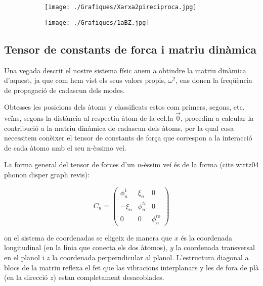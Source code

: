 \documentclass[12pt,twoside,a4paper]{article}%
\begin{document}
\begin{figure}[h]
\centering
\begin{subfigure}[b]{0.4\textwidth}
\texttt{[image: ./Grafiques/Xarxa2pireciproca.jpg]}
\end{subfigure}
\begin{subfigure}[b]{0.4\textwidth}
\texttt{[image: ./Grafiques/1aBZ.jpg]}
\end{subfigure}
\end{figure}





\subsection{Tensor de constants de forca i matriu dinàmica}

Una vegada descrit el nostre sistema físic anem a obtindre la matriu dinàmica d'aquest, ja que com hem vist els seus valors propis, $\omega^2$, ens donen la freqüència de propagació de cadascun dels modes.

Obtesses les posicions dels àtoms y classificats estos com primers, segons, etc. veïns, segons la distància al respectiu àtom de la ce\l.la $\vec 0$, procedim a calcular la contribució a la matriu dinàmica de cadascun dels àtoms, per la qual cosa necessitem conèixer el tensor de constants de for\c{c}a que correspon a la interacció de cada àtomo amb el seu n-èssimo veí.

La forma general del tensor de forces d'un $n$-èssim veí és de la forma (cite wirtz04 phonon disper graph revis): 


\begin{equation}
C_n=\begin{pmatrix}
\phi_n^1&\xi_n &0\\
-\xi_n & \phi_n^{ti} & 0 \\
0 & 0 & \phi_n^{to}
\end{pmatrix}
\label{eq:tensordeforces}
\end{equation}

on el sistema de coordenadas se eligeix de manera que $x$ és la coordenada longitudinal (en la línia que conecta els dos àtomos), $y$ la coordenada transversal en el planol i $z$ la coordenada perperndicular al planol. L'estructura diagonal a blocs de la matriu reflexa el fet que las vibracions interplanars y les de fora de plà (en la direcció $z$) estan completament desacoblades.
\end{document}

